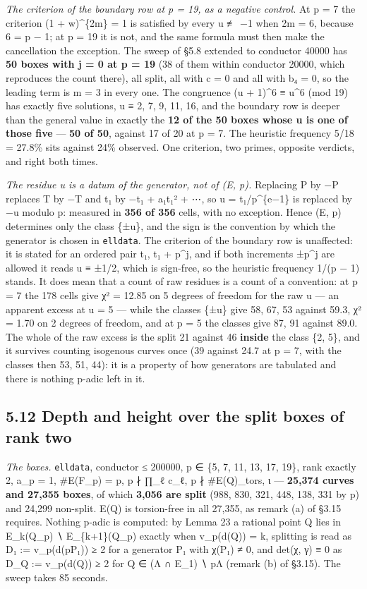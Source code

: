 \documentclass[11pt,a4paper]{article}
\theoremstyle{named}
\begin{document}
\textit{The criterion of the boundary row at p = 19, as a negative control.} At p = 7 the criterion (1 + w)\textasciicircum{}\{2m\} = 1 is satisfied by every u ≢ −1 when 2m = 6, because 6 = p − 1; at p = 19 it is not, and the same formula must then make the cancellation the exception. The sweep of §5.8 extended to conductor 40000 has \textbf{50 boxes with j = 0 at p = 19} (38 of them within conductor 20000, which reproduces the count there), all split, all with c = 0 and all with b₄ = 0, so the leading term is m = 3 in every one. The congruence (u + 1)\textasciicircum{}6 ≡ u\textasciicircum{}6 (mod 19) has exactly five solutions, u ≡ 2, 7, 9, 11, 16, and the boundary row is deeper than the general value in exactly the \textbf{12 of the 50 boxes whose u is one of those five} — \textbf{50 of 50}, against 17 of 20 at p = 7. The heuristic frequency 5/18 = 27.8\% sits against 24\% observed. One criterion, two primes, opposite verdicts, and right both times.

\textit{The residue u is a datum of the generator, not of (E, p).} Replacing P by −P replaces T by −T and t₁ by −t₁ + a₁t₁² + ⋯, so u = t₁/p\textasciicircum{}\{e−1\} is replaced by −u modulo p: measured in \textbf{356 of 356} cells, with no exception. Hence (E, p) determines only the class \{±u\}, and the sign is the convention by which the generator is chosen in \texttt{elldata}. The criterion of the boundary row is unaffected: it is stated for an ordered pair t₁, t₁ + p\textasciicircum{}j, and if both increments ±p\textasciicircum{}j are allowed it reads u ≡ ±1/2, which is sign-free, so the heuristic frequency 1/(p − 1) stands. It does mean that a count of raw residues is a count of a convention: at p = 7 the 178 cells give χ² = 12.85 on 5 degrees of freedom for the raw u — an apparent excess at u = 5 — while the classes \{±u\} give 58, 67, 53 against 59.3, χ² = 1.70 on 2 degrees of freedom, and at p = 5 the classes give 87, 91 against 89.0. The whole of the raw excess is the split 21 against 46 \textbf{inside} the class \{2, 5\}, and it survives counting isogenous curves once (39 against 24.7 at p = 7, with the classes then 53, 51, 44): it is a property of how generators are tabulated and there is nothing p-adic left in it.

\subsection*{5.12 Depth and height over the split boxes of rank two}

\textit{The boxes.} \texttt{elldata}, conductor ≤ 200000, p ∈ \{5, 7, 11, 13, 17, 19\}, rank exactly 2, a\_p = 1, \#E(F\_p) = p, p ∤ ∏\_ℓ c\_ℓ, p ∤ \#E(Q)\_tors, ι — \textbf{25,374 curves and 27,355 boxes}, of which \textbf{3,056 are split} (988, 830, 321, 448, 138, 331 by p) and 24,299 non-split. E(Q) is torsion-free in all 27,355, as remark (a) of §3.15 requires. Nothing p-adic is computed: by Lemma 23 a rational point Q lies in E\_k(Q\_p) ∖ E\_\{k+1\}(Q\_p) exactly when v\_p(d(Q)) = k, splitting is read as D₁ := v\_p(d(pP₁)) ≥ 2 for a generator P₁ with χ(P₁) ≠ 0, and det(χ, γ) ≡ 0 as D\_Q := v\_p(d(Q)) ≥ 2 for Q ∈ (Λ ∩ E\_1) ∖ pΛ (remark (b) of §3.15). The sweep takes 85 seconds.
\end{document}
